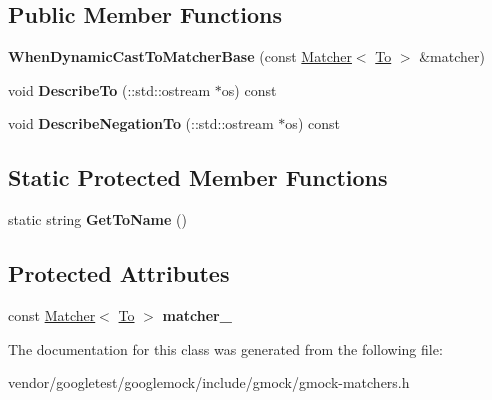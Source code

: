 \subsection*{Public Member Functions}
\begin{DoxyCompactItemize}
\item 
\mbox{\label{classtesting_1_1internal_1_1_when_dynamic_cast_to_matcher_base_a7da2a4c7c43d5e18db0a3233a601c8ab}} 
{\bfseries When\+Dynamic\+Cast\+To\+Matcher\+Base} (const \mbox{\hyperlink{classtesting_1_1_matcher}{Matcher}}$<$ \mbox{\hyperlink{classtesting_1_1internal_1_1_to}{To}} $>$ \&matcher)
\item 
\mbox{\label{classtesting_1_1internal_1_1_when_dynamic_cast_to_matcher_base_a6541f9bbcdc21e41521654c603cd2626}} 
void {\bfseries Describe\+To} (\+::std\+::ostream $\ast$os) const
\item 
\mbox{\label{classtesting_1_1internal_1_1_when_dynamic_cast_to_matcher_base_a0221de18d3b1945f8bc27fb349116564}} 
void {\bfseries Describe\+Negation\+To} (\+::std\+::ostream $\ast$os) const
\end{DoxyCompactItemize}
\subsection*{Static Protected Member Functions}
\begin{DoxyCompactItemize}
\item 
\mbox{\label{classtesting_1_1internal_1_1_when_dynamic_cast_to_matcher_base_a5950142a073ce7a1931848a958c88962}} 
static string {\bfseries Get\+To\+Name} ()
\end{DoxyCompactItemize}
\subsection*{Protected Attributes}
\begin{DoxyCompactItemize}
\item 
\mbox{\label{classtesting_1_1internal_1_1_when_dynamic_cast_to_matcher_base_a40d697407c960bee8fe3b125f5ac8730}} 
const \mbox{\hyperlink{classtesting_1_1_matcher}{Matcher}}$<$ \mbox{\hyperlink{classtesting_1_1internal_1_1_to}{To}} $>$ {\bfseries matcher\+\_\+}
\end{DoxyCompactItemize}


The documentation for this class was generated from the following file\+:\begin{DoxyCompactItemize}
\item 
vendor/googletest/googlemock/include/gmock/gmock-\/matchers.\+h\end{DoxyCompactItemize}
